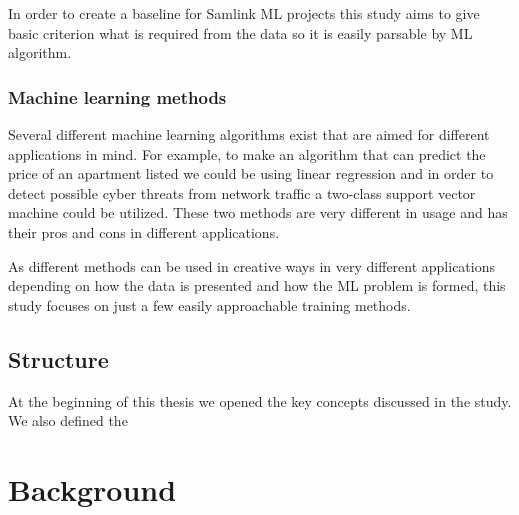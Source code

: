\documentclass[english, 12pt, a4paper, elec, utf8, a-1b, online]{aaltothesis}
\begin{document}
In order to create a baseline for Samlink ML projects
this study aims to give basic criterion
what is required from the data
so it is easily parsable by ML algorithm.


\subsubsection*{Machine learning methods}
Several different machine learning algorithms exist
that are aimed for different applications in mind.
For example,
to make an algorithm that can predict
the price of an apartment listed\cite{Winky}
we could be using linear regression
and in order to detect
possible cyber threats from network traffic\cite{Ghanem}
a two-class support vector machine could be utilized.
These two methods are very different in usage
and has their pros and cons in different applications.

As different methods can be used in creative ways
in very different applications
depending on how the data is presented
and how the ML problem is formed,
this study focuses on
just a few easily approachable training methods.


\subsection{Structure}\label{subsec:structure}
At the beginning of this thesis
we opened the key concepts discussed in the study.
We also defined the




\clearpage





\section{Background}\label{sec:background}

\end{document}
